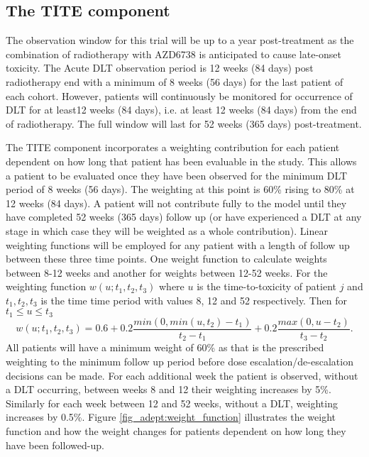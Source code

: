 \subsection{The TITE component}
\label{adept:The-TITE-component}

The observation window for this trial will be up to a year post-treatment as the combination of radiotherapy with AZD6738 is anticipated to cause late-onset toxicity. The Acute DLT observation period is 12 weeks (84 days) post radiotherapy end with a minimum of 8 weeks (56 days) for the last patient of each cohort. However, patients will continuously be monitored for occurrence of DLT for at least12 weeks (84 days), i.e. at least 12 weeks (84 days) from the end of radiotherapy. The full window will last for 52 weeks (365 days) post-treatment.

The TITE component incorporates a weighting contribution for each patient dependent on how long that patient has been evaluable in the study. This allows a patient to be evaluated once they have been observed for the minimum DLT period of 8 weeks (56 days). The weighting at this point is 60\% rising to 80\% at 12 weeks (84 days). A patient will not contribute fully to the model until they have completed 52 weeks (365 days) follow up (or have experienced a DLT at any stage in which case they will be weighted as a whole contribution). Linear weighting functions will be employed for any patient with a length of follow up between these three time points. One weight function to calculate weights between 8-12 weeks and another for weights between 12-52 weeks. For the weighting function $w(u;t_1, t_2, t_3)$ where $u$ is the time-to-toxicity of patient $j$ and $t_1, t_2, t_3$ is the time time period with values 8, 12 and 52 respectively. Then for $t_1 \leq u \leq t_3$
\begin{equation}
w(u;t_1,t_2,t_3) = 0.6 + 0.2\frac{min(0, min(u, t_2) - t_1)}{t_2 - t_1} + 0.2\frac{max(0, u - t_2)}{t_3-t_2}.
\end{equation} 
All patients will have a minimum weight of 60\% as that is the prescribed weighting to the  minimum follow up period before dose escalation/de-escalation decisions can be made. For each additional week the patient is observed, without a DLT occurring, between weeks 8 and 12 their weighting increases by 5\%. Similarly for each week between 12 and 52 weeks, without a DLT, weighting increases by 0.5\%. Figure \ref{fig_adept:weight_function} illustrates the weight function and how the weight changes for patients dependent on how long they have been followed-up.   

